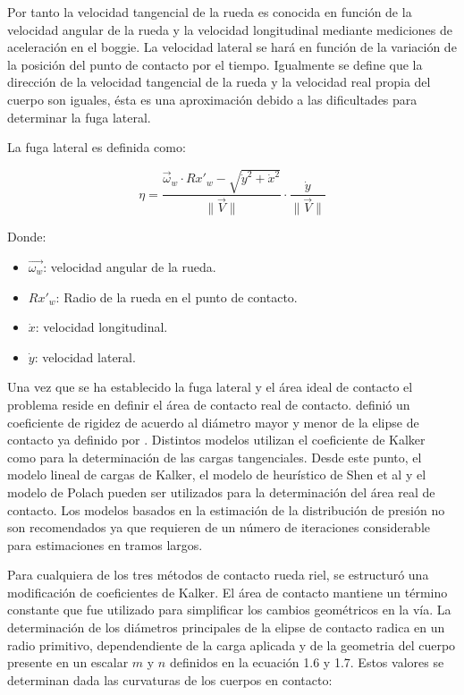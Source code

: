 \documentclass[main]{subfiles}
\begin{document}
Por tanto la velocidad tangencial de la rueda es conocida en función de la velocidad angular de la rueda y la velocidad longitudinal mediante mediciones de aceleración en el boggie. La velocidad lateral se hará en función de la variación de la posición del punto de contacto por el tiempo. Igualmente se define que la dirección de la velocidad tangencial de la rueda y la velocidad real propia del cuerpo son iguales, ésta es una aproximación debido a las dificultades para determinar la fuga lateral.

La fuga lateral es definida como:

\begin{equation}
\eta=\frac{\vec{\omega}_w\cdot Rx'_w-\sqrt{\dot{y}^2+\dot{x}^2}}{\|\vec{V}\|}\cdot
\frac{\dot{y}}{\|\vec{V}\|} 
\end{equation}

\par \hspace{2cm}
\begin{minipage}{8cm}
\begin{spacing}{0.5}
Donde:
\begin{itemize}
\item $\vec{\omega_w}$: velocidad angular de la rueda.
\item $Rx'_w$: Radio de la rueda en el punto de contacto.
\item $\dot{x}$: velocidad longitudinal.
\item $\dot{y}$: velocidad lateral.
\end{itemize}
\end{spacing}
\end{minipage}

Una vez que se ha establecido la fuga lateral y el área ideal de contacto el problema reside en definir el área de contacto real de contacto. \citet{Kalker1991243} definió un coeficiente de rigidez de acuerdo al diámetro mayor y menor de la elipse de contacto ya definido por \citet{Herz1881}. Distintos modelos utilizan el coeficiente de Kalker como para la determinación de las cargas tangenciales. Desde este punto, el modelo lineal de cargas de Kalker, el modelo de heurístico de Shen et al y el modelo de Polach pueden ser utilizados para la determinación del área real de contacto. Los modelos basados en la estimación de la distribución de presión no son recomendados ya que requieren de un número de iteraciones considerable para estimaciones en tramos largos.

Para cualquiera de los tres métodos de contacto rueda riel, se estructuró una modificación de coeficientes de Kalker. El área de contacto mantiene un término constante que fue utilizado para simplificar los cambios geométricos en la vía. La determinación de los diámetros principales de la elipse de contacto radica en un radio primitivo, dependendiente de la carga aplicada y de la geometria del cuerpo presente en un escalar $m$ y $n$ definidos en la ecuación 1.6 y 1.7. Estos valores se determinan dada las curvaturas de los cuerpos en contacto:
\end{document}
